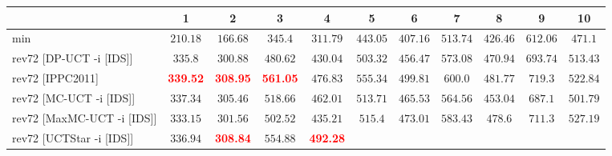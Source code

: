 \documentclass{article}
\begin{document}
\begin{tabular}{|l|r@{$\pm$}rr@{$\pm$}rr@{$\pm$}rr@{$\pm$}rr@{$\pm$}rr@{$\pm$}rr@{$\pm$}rr@{$\pm$}rr@{$\pm$}rr@{$\pm$}r|}
\hline

& \multicolumn{2}{c}{1}
& \multicolumn{2}{c}{2}
& \multicolumn{2}{c}{3}
& \multicolumn{2}{c}{4}
& \multicolumn{2}{c}{5}
& \multicolumn{2}{c}{6}
& \multicolumn{2}{c}{7}
& \multicolumn{2}{c}{8}
& \multicolumn{2}{c}{9}
& \multicolumn{2}{c|}{10}
\\
\hline
\hline
min
& \multicolumn{2}{c}{$210.18$}
& \multicolumn{2}{c}{$166.68$}
& \multicolumn{2}{c}{$345.4$}
& \multicolumn{2}{c}{$311.79$}
& \multicolumn{2}{c}{$443.05$}
& \multicolumn{2}{c}{$407.16$}
& \multicolumn{2}{c}{$513.74$}
& \multicolumn{2}{c}{$426.46$}
& \multicolumn{2}{c}{$612.06$}
& \multicolumn{2}{c|}{$471.1$}
\\
rev72 [DP-UCT -i [IDS]]
& \multicolumn{2}{c}{$335.8$}
& \multicolumn{2}{c}{$300.88$}
& \multicolumn{2}{c}{$480.62$}
& \multicolumn{2}{c}{$430.04$}
& \multicolumn{2}{c}{$503.32$}
& \multicolumn{2}{c}{$456.47$}
& \multicolumn{2}{c}{$573.08$}
& \multicolumn{2}{c}{$470.94$}
& \multicolumn{2}{c}{$693.74$}
& \multicolumn{2}{c|}{$513.43$}
\\
rev72 [IPPC2011]
& \multicolumn{2}{c}{\textbf{\textcolor{red}{339.52}}}
& \multicolumn{2}{c}{\textbf{\textcolor{red}{308.95}}}
& \multicolumn{2}{c}{\textbf{\textcolor{red}{561.05}}}
& \multicolumn{2}{c}{$476.83$}
& \multicolumn{2}{c}{$555.34$}
& \multicolumn{2}{c}{$499.81$}
& \multicolumn{2}{c}{$600.0$}
& \multicolumn{2}{c}{$481.77$}
& \multicolumn{2}{c}{$719.3$}
& \multicolumn{2}{c|}{$522.84$}
\\
rev72 [MC-UCT -i [IDS]]
& \multicolumn{2}{c}{$337.34$}
& \multicolumn{2}{c}{$305.46$}
& \multicolumn{2}{c}{$518.66$}
& \multicolumn{2}{c}{$462.01$}
& \multicolumn{2}{c}{$513.71$}
& \multicolumn{2}{c}{$465.53$}
& \multicolumn{2}{c}{$564.56$}
& \multicolumn{2}{c}{$453.04$}
& \multicolumn{2}{c}{$687.1$}
& \multicolumn{2}{c|}{$501.79$}
\\
rev72 [MaxMC-UCT -i [IDS]]
& \multicolumn{2}{c}{$333.15$}
& \multicolumn{2}{c}{$301.56$}
& \multicolumn{2}{c}{$502.52$}
& \multicolumn{2}{c}{$435.21$}
& \multicolumn{2}{c}{$515.4$}
& \multicolumn{2}{c}{$473.01$}
& \multicolumn{2}{c}{$583.43$}
& \multicolumn{2}{c}{$478.6$}
& \multicolumn{2}{c}{$711.3$}
& \multicolumn{2}{c|}{$527.19$}
\\
rev72 [UCTStar -i [IDS]]
& \multicolumn{2}{c}{$336.94$}
& \multicolumn{2}{c}{\textbf{\textcolor{red}{308.84}}}
& \multicolumn{2}{c}{$554.88$}
& \multicolumn{2}{c}{\textbf{\textcolor{red}{492.28}}}

\end{tabular}
\end{document}
